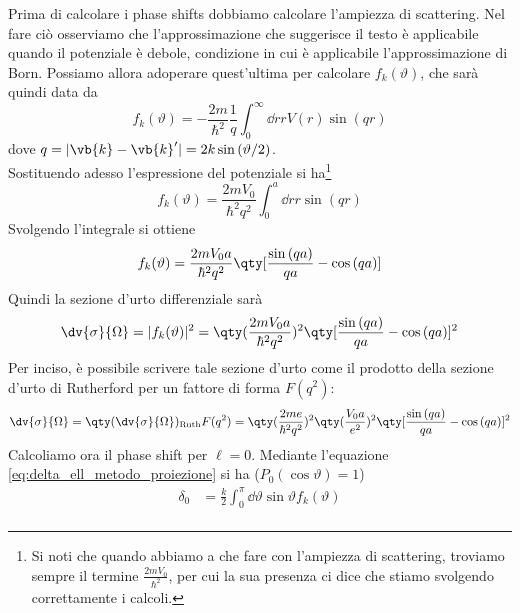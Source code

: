 \begin{soluzione}
\begin{equation}
   \end{equation}
   Prima di calcolare i phase shifts dobbiamo calcolare l'ampiezza di scattering. Nel fare ciò osserviamo che l'approssimazione che suggerisce il testo è applicabile quando il potenziale è debole, condizione in cui è applicabile l'approssimazione di Born. Possiamo allora adoperare quest'ultima per calcolare $f_k(\vartheta)$, che sarà quindi data da
   \begin{equation*}
      f_k(\vartheta)
      =-\frac{2m}{\hbar^2} \frac{1}{q} \int_{0}^{\infty} \dd{r} r V(r) \sin{(qr)}
   \end{equation*}
   dove $q=|\vb{k} - \vb{k}'|=2k \sin{(\vartheta/2)}$.\\ Sostituendo adesso l'espressione del potenziale si ha\footnote{Si noti che quando abbiamo a che fare con l'ampiezza di scattering, troviamo sempre il termine $\frac{2m V_0}{\hbar^2}$, per cui la sua presenza ci dice che stiamo svolgendo correttamente i calcoli.}
   \begin{equation*}
      f_k(\vartheta)
      =\frac{2m V_0}{\hbar^2 q^2} \int_{0}^{a} \dd{r} r \sin{(qr)}
   \end{equation*}
   Svolgendo l'integrale si ottiene
   \begin{equation*}
      f_k(\vartheta)
      =\frac{2m V_0 a}{\hbar^2 q^2} \qty[ \frac{\sin{(qa)}}{qa} - \cos{(qa)} ]
   \end{equation*}
   Quindi la sezione d'urto differenziale sarà
   \begin{equation*}
      \dv{\sigma}{\Omega}
      =| f_k(\vartheta) |^2
      =\qty( \frac{2m V_0 a}{\hbar^2 q^2} )^2 \qty[ \frac{\sin{(qa)}}{qa} - \cos{(qa)} ]^2
   \end{equation*}
   Per inciso, è possibile scrivere tale sezione d'urto come il prodotto della sezione d'urto di Rutherford per un fattore di forma $F(q^2)$:
   \begin{equation*}
      \dv{\sigma}{\Omega}
      =\qty( \dv{\sigma}{\Omega} )_{\rm Ruth} F(q^2)
      =\qty( \frac{2m e}{\hbar^2 q^2} )^2 \qty( \frac{ V_0 a}{e^2} )^2 \qty[ \frac{\sin{(qa)}}{qa} - \cos{(qa)} ]^2
   \end{equation*}
   Calcoliamo ora il phase shift per $\ell=0$. Mediante l'equazione \eqref{eq:delta_ell_metodo_proiezione} si ha ($P_0(\cos{\vartheta})=1$)
   \begin{equation*}
      \begin{split}
         \delta_0
         & =\frac{k}{2} \int_{0}^{\pi} \dd{\vartheta} \sin{\vartheta} f_k(\vartheta)
         \\

\end{split}
\end{equation*}
\end{soluzione}

